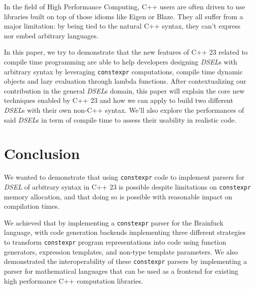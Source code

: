 \documentclass[english,12pt,a4paper]{book}
\providecommand{\constexpr}{\lstinline{constexpr}\xspace}
\providecommand{\cpp}{\textsc{C++}\xspace}
\providecommand{\dsels}{\textit{DSEL}s\xspace}
\providecommand{\dsel}{\textit{DSEL}\xspace}
\begin{document}
In the field of High Performance Computing, \cpp users are often driven to use
libraries built on top of those idioms like Eigen\cite{eigen} or
Blaze\cite{blazelib,iglberger2012_2}. They all suffer from a major limitation:
by being tied to the natural \cpp syntax, they can't express nor embed arbitrary
languages.

In this paper, we try to demonstrate that the new features of \cpp23 related to
compile time programming are able to help developers designing \dsels with
arbitrary syntax by leveraging \constexpr computations, compile time dynamic
objects and lazy evaluation through lambda functions. After contextualizing our
contribution in the general \dsels domain, this paper will explain the core
new techniques enabled by \cpp23 and how we can apply to build two different
\dsels with their own non-\cpp syntax. We'll also explore the performances of
said \dsels in term of compile time to assess their usability in realistic code.






\section{Conclusion}


We wanted to demonstrate that using \constexpr code to implement parsers for
\dsel of arbitrary syntax in \cpp23 is possible despite limitations on
\constexpr memory allocation, and that doing so is possible with reasonable
impact on compilation times.

We achieved that by implementing a \constexpr parser for the Brainfuck language,
with code generation backends implementing three different strategies to
transform \constexpr program representations into code using function
generators, expression templates, and non-type template parameters.
We also demonstrated the interoperability of these \constexpr parsers by
implementing a parser for mathematical languages that can be used as a frontend
for existing high performance \cpp computation libraries.
\end{document}
